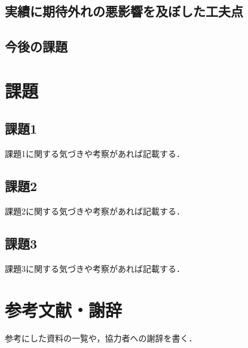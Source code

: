 \documentclass[10pt,a4j]{ujarticle} %
\begin{document}
\subsection{実績に期待外れの悪影響を及ぼした工夫点}


\subsection{今後の課題}


\section{課題}
\subsection{課題1}
課題1に関する気づきや考察があれば記載する．

\subsection{課題2}
課題2に関する気づきや考察があれば記載する．

\subsection{課題3}
課題3に関する気づきや考察があれば記載する．

\section{参考文献・謝辞}
参考にした資料の一覧や，協力者への謝辞を書く．
\end{document}
